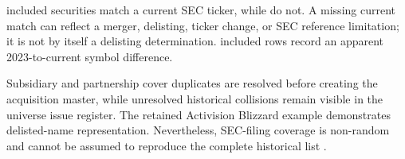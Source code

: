 
\CurrentTickerMatches{} included securities match a current SEC ticker, while \NoCurrentTickerMatches{} do not. A missing current match can reflect a merger, delisting, ticker change, or SEC reference limitation; it is not by itself a delisting determination. \TickerChanges{} included rows record an apparent 2023-to-current symbol difference.

Subsidiary and partnership cover duplicates are resolved before creating the acquisition master, while unresolved historical collisions remain visible in the universe issue register. The retained Activision Blizzard example demonstrates delisted-name representation. Nevertheless, SEC-filing coverage is non-random and cannot be assumed to reproduce the complete historical list \citep{brown1992survivorship,shumway1997delisting}.
